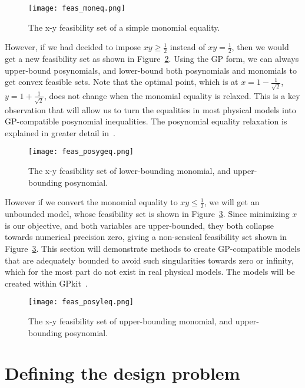 \begin{figure}
    \centering
    \texttt{[image: feas\_moneq.png]}
    \caption{The x-y feasibility set of a simple monomial equality.}
    \label{f:feas_moneq}
\end{figure}

However, if we had decided to impose $xy \geq \frac{1}{2}$ instead of $xy = \frac{1}{2}$,
then we would get a new feasibility set as shown in Figure~\ref{f:feas_posygeq}.
Using the \gls{GP} form, we can always upper-bound posynomials, and lower-bound both posynomials
and monomials to get convex feasible sets. Note that the optimal point, which is at
$x = 1 - \frac{1}{\sqrt{2}}$, $y = 1 + \frac{1}{\sqrt{2}}$,
does not change when the monomial equality is relaxed. This is a key
observation that will allow us to turn the equalities in most physical models into \gls{GP}-compatible
posynomial inequalities. The posynomial equality relaxation is explained in greater detail
in~\cite{hoburg_thesis}.

\begin{figure}
    \centering
    \texttt{[image: feas\_posygeq.png]}
    \caption{The x-y feasibility set of lower-bounding monomial,
    and upper-bounding posynomial.}
    \label{f:feas_posygeq}
\end{figure}

However if we convert the monomial equality to  $xy \leq \frac{1}{2}$, we will get an unbounded model,
whose feasibility set is shown in Figure~\ref{f:feas_posyleq}.
Since minimizing $x$ is our objective, and both variables are upper-bounded,
they both collapse towards numerical precision zero,
giving a non-sensical feasibility set shown in Figure~\ref{f:feas_posyleq}. This section will
demonstrate methods to create \gls{GP}-compatible models that are adequately bounded to avoid such
singularities towards zero or infinity, which for the most part do not
exist in real physical models. The models will be created within GPkit~\cite{gpkit}.

\begin{figure}
    \centering
    \texttt{[image: feas\_posyleq.png]}
    \caption{The x-y feasibility set of upper-bounding monomial,
    and upper-bounding posynomial.}
    \label{f:feas_posyleq}
\end{figure}

\section{Defining the design problem}

